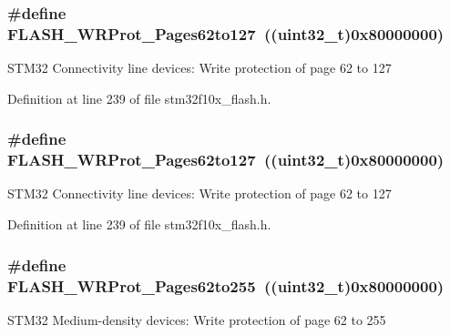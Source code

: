 \subsubsection[{\texorpdfstring{F\+L\+A\+S\+H\+\_\+\+W\+R\+Prot\+\_\+\+Pages62to127}{FLASH_WRProt_Pages62to127}}]{\setlength{\rightskip}{0pt plus 5cm}\#define F\+L\+A\+S\+H\+\_\+\+W\+R\+Prot\+\_\+\+Pages62to127~(({\bf uint32\+\_\+t})0x80000000)}\hypertarget{group___option___bytes___write___protection_ga346285408d8f738796fc22d710777ba9}{}\label{group___option___bytes___write___protection_ga346285408d8f738796fc22d710777ba9}
S\+T\+M32 Connectivity line devices\+: Write protection of page 62 to 127 

Definition at line 239 of file stm32f10x\+\_\+flash.\+h.

\subsubsection[{\texorpdfstring{F\+L\+A\+S\+H\+\_\+\+W\+R\+Prot\+\_\+\+Pages62to127}{FLASH_WRProt_Pages62to127}}]{\setlength{\rightskip}{0pt plus 5cm}\#define F\+L\+A\+S\+H\+\_\+\+W\+R\+Prot\+\_\+\+Pages62to127~(({\bf uint32\+\_\+t})0x80000000)}\hypertarget{group___option___bytes___write___protection_ga346285408d8f738796fc22d710777ba9}{}\label{group___option___bytes___write___protection_ga346285408d8f738796fc22d710777ba9}
S\+T\+M32 Connectivity line devices\+: Write protection of page 62 to 127 

Definition at line 239 of file stm32f10x\+\_\+flash.\+h.

\subsubsection[{\texorpdfstring{F\+L\+A\+S\+H\+\_\+\+W\+R\+Prot\+\_\+\+Pages62to255}{FLASH_WRProt_Pages62to255}}]{\setlength{\rightskip}{0pt plus 5cm}\#define F\+L\+A\+S\+H\+\_\+\+W\+R\+Prot\+\_\+\+Pages62to255~(({\bf uint32\+\_\+t})0x80000000)}\hypertarget{group___option___bytes___write___protection_gacec4a825ff505ef5751ec6e5cf6d941e}{}\label{group___option___bytes___write___protection_gacec4a825ff505ef5751ec6e5cf6d941e}
S\+T\+M32 Medium-\/density devices\+: Write protection of page 62 to 255 

